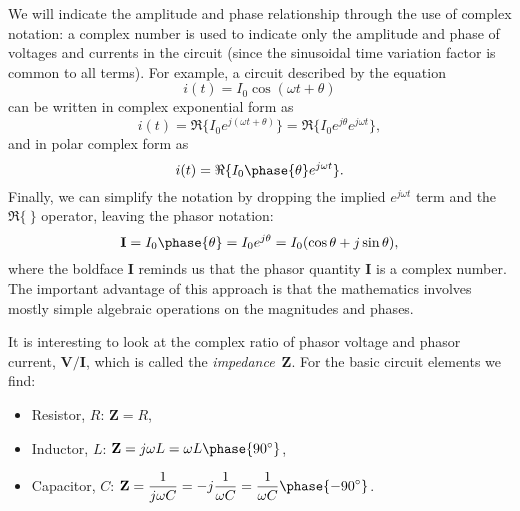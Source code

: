 \documentclass[a4paper]{article}
\begin{document}
We will indicate the amplitude and phase relationship through the use
of complex notation: a complex number is used to indicate only the
amplitude and phase of voltages and currents in the circuit (since the
sinusoidal time variation factor is common to all terms).  For
example, a circuit described by the equation
\[
i(t)=I_{0}\cos(\omega t+\theta)
\]
can be written in complex exponential form as
\[
i(t)=\Re\{I_{0}e^{j(\omega t+\theta)}\}=
\Re\{I_{0}e^{j\theta}e^{j\omega t}\},
\]
and in polar complex form as
\[
i(t)=\Re\{I_{0}\phase{\theta}e^{j\omega t}\}.
\]
Finally, we can simplify the notation by dropping the implied
$e^{j\omega t}$ term and the $\Re\{~\}$ operator, leaving the phasor
notation:
\[
\mathbf{I}=I_{0}\phase{\theta}=I_{0}e^{j\theta}=
I_{0}(\cos\theta+j\sin\theta),
\]
where the boldface $\mathbf{I}$ reminds us that the phasor quantity
$\mathbf{I}$ is a complex number.  The important advantage of this
approach is that the mathematics involves mostly simple algebraic
operations on the magnitudes and phases.

It is interesting to look at the complex ratio of phasor voltage and
phasor current, $\mathbf{V}\!/\mathbf{I}$, which is called the
\emph{impedance}~$\mathbf{Z}$.  For the basic circuit elements we
find:
\begin{itemize}
\item Resistor, $R$: $\mathbf{Z}=R$,
\item Inductor, $L$: $\mathbf{Z}=j\omega L=
  \omega L\phase{90^{\circ}}$,
\item Capacitor, $C$: $\displaystyle\mathbf{Z}=\frac{1}{j\omega C}=
  -j\frac{1}{\omega C}=\frac{1}{\omega C}\phase{-90^{\circ}}$.
\end{itemize}
\end{document}
